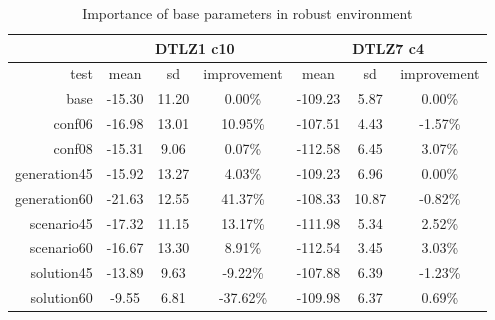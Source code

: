 \begin{table}
  \centering
  \caption{Importance of base parameters in robust environment}
  \label{t:base2_imp_2}
  \begin{tabular}{r c c c c c c}
    & \multicolumn{3}{c}{DTLZ1 c10} & \multicolumn{3}{c}{DTLZ7 c4} \\
    \hline
    test & mean & sd & improvement & mean & sd & improvement \\
    \hline
    \hline
    base & -15.30 & 11.20 & 0.00\% & -109.23 & 5.87 & 0.00\% \\
    conf06 & -16.98 & 13.01 & 10.95\% & -107.51 & 4.43 & -1.57\% \\
    conf08 & -15.31 & 9.06 & 0.07\% & -112.58 & 6.45 & 3.07\% \\
    generation45 & -15.92 & 13.27 & 4.03\% & -109.23 & 6.96 & 0.00\% \\
    generation60 & -21.63 & 12.55 & 41.37\% & -108.33 & 10.87 & -0.82\% \\
    scenario45 & -17.32 & 11.15 & 13.17\% & -111.98 & 5.34 & 2.52\% \\
    scenario60 & -16.67 & 13.30 & 8.91\% & -112.54 & 3.45 & 3.03\% \\
    solution45 & -13.89 & 9.63 & -9.22\% & -107.88 & 6.39 & -1.23\% \\
    solution60 & -9.55 & 6.81 & -37.62\% & -109.98 & 6.37 & 0.69\% \\
    \hline
  \end{tabular}
\end{table}

